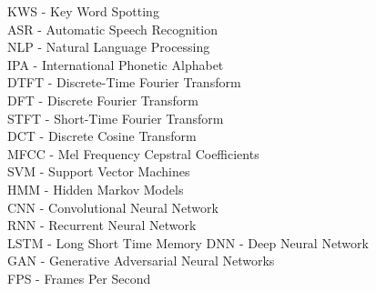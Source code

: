 
KWS - Key Word Spotting\\
ASR - Automatic Speech Recognition\\
NLP - Natural Language Processing\\
IPA - International Phonetic Alphabet\\
%
DTFT - Discrete-Time Fourier Transform\\
DFT - Discrete Fourier Transform\\
STFT - Short-Time Fourier Transform\\
DCT - Discrete Cosine Transform\\
MFCC - Mel Frequency Cepstral Coefficients\\
%
SVM - Support Vector Machines\\
HMM - Hidden Markov Models\\
%
CNN - Convolutional Neural Network\\
RNN - Recurrent Neural Network\\
LSTM - Long Short Time Memory
DNN - Deep Neural Network\\
GAN - Generative Adversarial Neural Networks\\
%
FPS - Frames Per Second\\